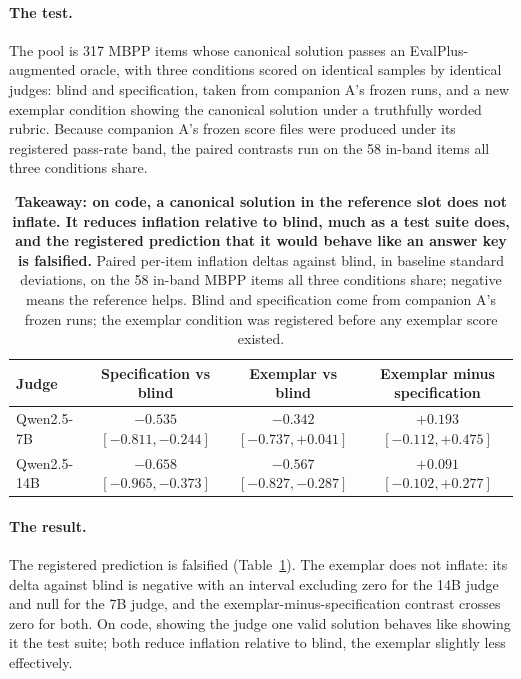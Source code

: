 \documentclass[11pt]{article}
\begin{document}
\paragraph{The test.}
The pool is 317 MBPP items whose canonical solution passes an EvalPlus-augmented oracle, with three conditions scored on identical samples by identical judges: blind and specification, taken from companion A's frozen runs, and a new exemplar condition showing the canonical solution under a truthfully worded rubric. Because companion A's frozen score files were produced under its registered pass-rate band, the paired contrasts run on the 58 in-band items all three conditions share.

\begin{table}[tbp]
\centering
\small
\setlength{\tabcolsep}{6pt}
\begin{tabular}{lccc}
\toprule
Judge & Specification vs blind & Exemplar vs blind & Exemplar minus specification \\
\midrule
Qwen2.5-7B  & $-0.535$ {\scriptsize$[-0.811,-0.244]$} & $-0.342$ {\scriptsize$[-0.737,+0.041]$} & $+0.193$ {\scriptsize$[-0.112,+0.475]$} \\
Qwen2.5-14B & $-0.658$ {\scriptsize$[-0.965,-0.373]$} & $-0.567$ {\scriptsize$[-0.827,-0.287]$} & $+0.091$ {\scriptsize$[-0.102,+0.277]$} \\
\bottomrule
\end{tabular}
\caption{\textbf{Takeaway: on code, a canonical solution in the reference slot does not inflate. It reduces inflation relative to blind, much as a test suite does, and the registered prediction that it would behave like an answer key is falsified.}
Paired per-item inflation deltas against blind, in baseline standard deviations, on the 58 in-band MBPP items all three conditions share; negative means the reference helps. Blind and specification come from companion A's frozen runs; the exemplar condition was registered before any exemplar score existed.}
\label{tab:code}
\end{table}

\paragraph{The result.}
The registered prediction is falsified (Table~\ref{tab:code}).
The exemplar does not inflate: its delta against blind is negative with an interval excluding zero for the 14B judge and null for the 7B judge, and the exemplar-minus-specification contrast crosses zero for both.
On code, showing the judge one valid solution behaves like showing it the test suite; both reduce inflation relative to blind, the exemplar slightly less effectively.
\end{document}
